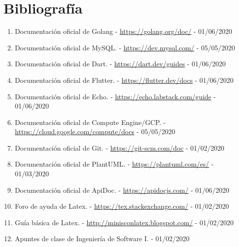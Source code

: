\chapter{Bibliografía}
\label{ch:capitulo9} 

\begin{enumerate}
	\item Documentación oficial de Golang - \url{https://golang.org/doc/} - 01/06/2020
	\item Documentación oficial de MySQL. - \url{https://dev.mysql.com/} - 05/05/2020
	\item Documentación oficial de Dart. - \url{https://dart.dev/guides} - 01/06/2020
	\item Documentación oficial de Flutter. - \url{https://flutter.dev/docs} - 01/06/2020
	\item Documentación oficial de Echo. - \url{https://echo.labstack.com/guide} - 01/06/2020
	\item Documentación oficial de Compute Engine/GCP. - \url{https://cloud.google.com/compute/docs} - 05/05/2020
	\item Documentación oficial de Git. - \url{https://git-scm.com/doc} - 01/02/2020
	\item Documentación oficial de PlantUML. - \url{https://plantuml.com/es/} - 01/03/2020
	\item Documentación oficial de ApiDoc. - \url{https://apidocjs.com/} - 01/06/2020
	\item Foro de ayuda de Latex. - \url{https://tex.stackexchange.com/} - 01/02/2020
	\item Guía básica de Latex. - \url{http://minisconlatex.blogspot.com/} - 01/02/2020
	\item Apuntes de clase de Ingeniería de Software I. - 01/02/2020
\end{enumerate}